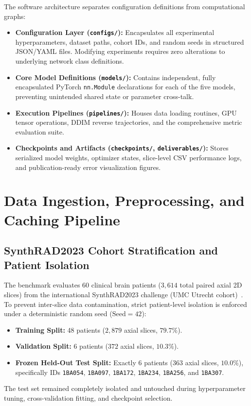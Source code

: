 The software architecture separates configuration definitions from computational graphs:
\begin{itemize}
    \item \textbf{Configuration Layer (\texttt{configs/}):} Encapsulates all experimental hyperparameters, dataset paths, cohort IDs, and random seeds in structured JSON/YAML files. Modifying experiments requires zero alterations to underlying network class definitions.
    \item \textbf{Core Model Definitions (\texttt{models/}):} Contains independent, fully encapsulated PyTorch \texttt{nn.Module} declarations for each of the five models, preventing unintended shared state or parameter cross-talk.
    \item \textbf{Execution Pipelines (\texttt{pipelines/}):} Houses data loading routines, GPU tensor operations, DDIM reverse trajectories, and the comprehensive metric evaluation suite.
    \item \textbf{Checkpoints and Artifacts (\texttt{checkpoints/}, \texttt{deliverables/}):} Stores serialized model weights, optimizer states, slice-level CSV performance logs, and publication-ready error visualization figures.
\end{itemize}

\section{Data Ingestion, Preprocessing, and Caching Pipeline}

\subsection{SynthRAD2023 Cohort Stratification and Patient Isolation}
The benchmark evaluates 60 clinical brain patients ($3,614$ total paired axial 2D slices) from the international SynthRAD2023 challenge (UMC Utrecht cohort)~\cite{thummerer2023synthrad2023}. To prevent inter-slice data contamination, strict patient-level isolation is enforced under a deterministic random seed ($\text{Seed} = 42$):
\begin{itemize}
    \item \textbf{Training Split:} 48 patients ($2,879$ axial slices, $79.7\%$).
    \item \textbf{Validation Split:} 6 patients ($372$ axial slices, $10.3\%$).
    \item \textbf{Frozen Held-Out Test Split:} Exactly 6 patients ($363$ axial slices, $10.0\%$), specifically IDs \texttt{1BA054}, \texttt{1BA097}, \texttt{1BA172}, \texttt{1BA234}, \texttt{1BA256}, and \texttt{1BA307}.
\end{itemize}
The test set remained completely isolated and untouched during hyperparameter tuning, cross-validation fitting, and checkpoint selection.

